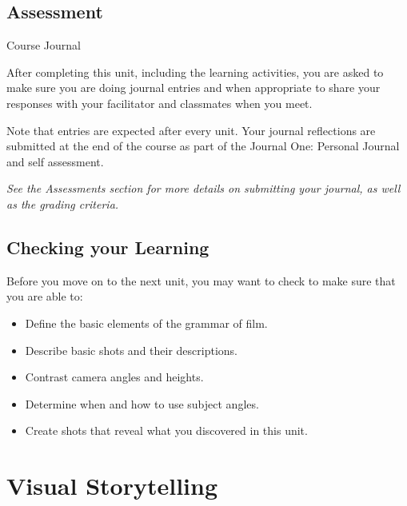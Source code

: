 \documentclass[
]{book}
\providecommand{\tightlist}{%
  \setlength{\itemsep}{0pt}\setlength{\parskip}{0pt}}
\begin{document}
\hypertarget{assessment-9}{%
\section*{Assessment}\label{assessment-9}}

\begin{assessment}
{Course Journal}

After completing this unit, including the learning activities, you are asked to make sure you are doing journal entries and when appropriate to share your responses with your facilitator and classmates when you meet.

Note that entries are expected after every unit. Your journal reflections are submitted at the end of the course as part of the Journal One: Personal Journal and self assessment.

\emph{See the Assessments section for more details on submitting your journal, as well as the grading criteria.}
\end{assessment}

\hypertarget{checking-your-learning-4}{%
\section*{Checking your Learning}\label{checking-your-learning-4}}

\begin{progress}
Before you move on to the next unit, you may want to check to make sure that you are able to:

\begin{itemize}
\tightlist
\item
  Define the basic elements of the grammar of film.\\
\item
  Describe basic shots and their descriptions.\\
\item
  Contrast camera angles and heights.\\
\item
  Determine when and how to use subject angles.\\
\item
  Create shots that reveal what you discovered in this unit.
\end{itemize}
\end{progress}

\hypertarget{visual-storytelling}{%
\chapter{Visual Storytelling}\label{visual-storytelling}}
\end{document}
